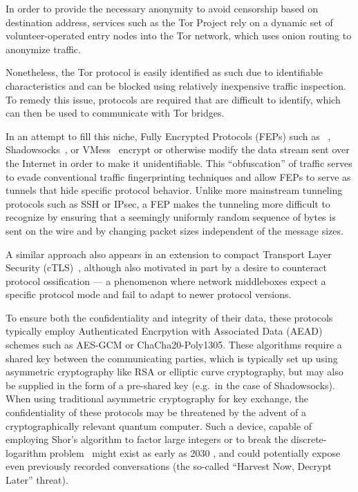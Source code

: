 In order to provide the necessary anonymity to avoid censorship based on destination address, services such as the Tor Project \cite{torproject} rely on a dynamic set of volunteer-operated entry nodes into the Tor network, which uses onion routing to anonymize traffic.

Nonetheless, the Tor protocol is easily identified as such due to identifiable characteristics and can be blocked using relatively inexpensive traffic inspection. To remedy this issue, protocols are required that are difficult to identify, which can then be used to communicate with Tor bridges.

In an attempt to fill this niche, Fully Encrypted Protocols (FEPs) such as \obfsfour{}~\cite{obfs4}, \textsf{Shadowsocks}~\cite{shadowsocks}, or \textsf{VMess}~\cite{vmess} encrypt or otherwise modify the data stream sent over the Internet in order to make it unidentifiable. This ``obfuscation'' of traffic serves to evade conventional traffic fingerprinting techniques and allow FEPs to serve as tunnels that hide specific protocol behavior.
Unlike more mainstream tunneling protocols such as SSH or IPsec, a FEP makes the tunneling more difficult to recognize by ensuring that a seemingly uniformly random sequence of bytes is sent on the wire and by changing packet sizes independent of the message sizes.

A similar approach also appears in an extension to compact Transport Layer Security (cTLS)~\cite{cpbs-pseudorandom-ctls-01}, although also motivated in part by a desire to counteract protocol ossification --- a phenomenon where network middleboxes expect a specific protocol mode and fail to adapt to newer protocol versions.

To ensure both the confidentiality and integrity of their data, these protocols typically employ Authenticated Encrpytion with Associated Data (AEAD) schemes such as AES-GCM or ChaCha20-Poly1305. These algorithms require a shared key between the communicating parties, which is typically set up using asymmetric cryptography like RSA or elliptic curve cryptography, but may also be supplied in the form of a pre-shared key (e.g.~in the case of Shadowsocks).
When using traditional asymmetric cryptography for key exchange, the confidentiality of these protocols may be threatened by the advent of a cryptographically relevant quantum computer.
Such a device, capable of employing Shor's algorithm \cite{Shor_1997} to factor large integers or to break the discrete-logarithm problem~\cite{crqc-nccoe} might exist as early as 2030 \cite{quantum-threat-joint,quantum-threat-bsi,quantum-threat-anssi,quantum-threat-enisa,quantum-threat-nist}, and could potentially expose even previously recorded conversations (the so-called ``Harvest Now, Decrypt Later'' threat).


